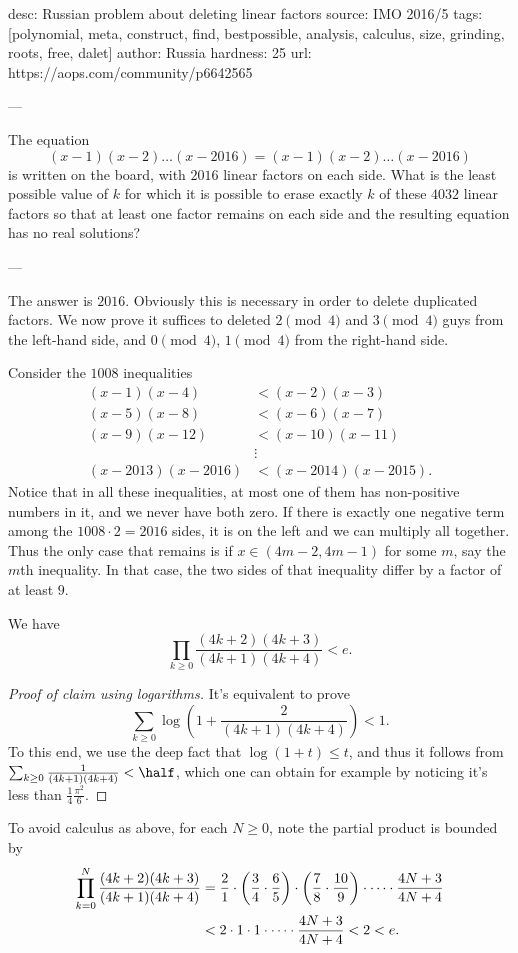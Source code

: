 desc:  Russian problem about deleting linear factors
source:  IMO 2016/5
tags:  [polynomial, meta, construct, find, bestpossible, analysis, calculus, size, grinding, roots, free, dalet]
author: Russia
hardness: 25
url: https://aops.com/community/p6642565

---

The equation
\[ (x-1)(x-2)\dots(x-2016)=(x-1)(x-2)\dots (x-2016) \]
is written on the board, with $2016$ linear factors on each side.
What is the least possible value of $k$ for which it is possible to
erase exactly $k$ of these $4032$ linear factors so that at least
one factor remains on each side and the resulting equation
has no real solutions?

---

The answer is $2016$.
Obviously this is necessary in order to delete duplicated factors.
We now prove it suffices to deleted $2 \pmod 4$ and $3 \pmod 4$
guys from the left-hand side, and $0 \pmod 4$,
$1 \pmod 4$ from the right-hand side.

Consider the $1008$ inequalities
\begin{align*}
  (x-1)(x-4) &< (x-2)(x-3) \\
  (x-5)(x-8) &< (x-6)(x-7) \\
  (x-9)(x-12) &< (x-10)(x-11) \\
  &\vdots \\
  (x-2013)(x-2016) &< (x-2014)(x-2015).
\end{align*}
Notice that in all these inequalities, at most one of them
has non-positive numbers in it, and we never have both zero.
If there is exactly one negative term among the $1008 \cdot 2 = 2016$ sides,
it is on the left and we can multiply all together.
Thus the only case that remains is if $x \in (4m-2, 4m-1)$ for some $m$,
say the $m$th inequality.
In that case, the two sides of that inequality differ by a factor of at least $9$.

\begin{claim*}
  We have \[ \prod_{k \ge 0} \frac{(4k+2)(4k+3)}{(4k+1)(4k+4)} < e. \]
\end{claim*}
\begin{proof}
  [Proof of claim using logarithms]
  It's equivalent to prove
  \[ \sum_{k \ge 0} \log \left( 1 + \frac{2}{(4k+1)(4k+4)} \right) < 1. \]
  To this end, we use the deep fact that $\log(1+t) \le t$,
  and thus it follows from
  $\sum_{k \ge 0} \frac{1}{(4k+1)(4k+4)} < \half$,
  which one can obtain for example by noticing
  it's less than $\frac14\frac{\pi^2}{6}$.
\end{proof}
\begin{remark*}
  To avoid calculus as above, for each $N \ge 0$, note the partial product is bounded by
  \begin{align*}
    \prod_{k=0}^N \frac{(4k+2)(4k+3)}{(4k+1)(4k+4)}
    &=
    \frac 21 \cdot \left( \frac 34 \cdot \frac 65 \right)
      \cdot \left( \frac 78 \cdot \frac{10}{9} \right) \cdot \dots
      \cdot \frac{4N+3}{4N+4} \\
    &< 2 \cdot 1 \cdot 1 \cdot \dots \cdot \frac{4N+3}{4N+4}
    < 2 < e. \qedhere
  \end{align*}
\end{remark*}

